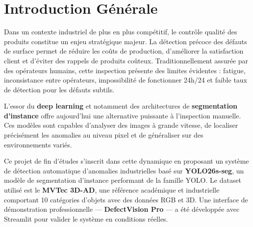 \documentclass[12pt, a4paper]{report}
\begin{document}
\newpage

\tableofcontents
\newpage

\listoffigures
{}
\newpage

\listoftables
{}
\newpage

\chapter*{Introduction Générale}

Dans un contexte industriel de plus en plus compétitif, le contrôle qualité des produits constitue un enjeu stratégique majeur. La détection précoce des défauts de surface permet de réduire les coûts de production, d'améliorer la satisfaction client et d'éviter des rappels de produits coûteux. Traditionnellement assurée par des opérateurs humains, cette inspection présente des limites évidentes : fatigue, inconsistance entre opérateurs, impossibilité de fonctionner 24h/24 et faible taux de détection pour les défauts subtils.

L'essor du \textbf{deep learning} et notamment des architectures de \textbf{segmentation d'instance} offre aujourd'hui une alternative puissante à l'inspection manuelle. Ces modèles sont capables d'analyser des images à grande vitesse, de localiser précisément les anomalies au niveau pixel et de généraliser sur des environnements variés.

Ce projet de fin d'études s'inscrit dans cette dynamique en proposant un système de détection automatique d'anomalies industrielles basé sur \textbf{YOLO26s-seg}, un modèle de segmentation d'instance performant de la famille YOLO. Le dataset utilisé est le \textbf{MVTec 3D-AD}, une référence académique et industrielle comportant 10 catégories d'objets avec des données RGB et 3D. Une interface de démonstration professionnelle — \textbf{DefectVision Pro} — a été développée avec Streamlit pour valider le système en conditions réelles.
\end{document}
